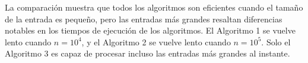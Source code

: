 La comparación muestra que todos los algoritmos
son eficientes cuando el tamaño de la entrada es pequeño,
pero las entradas más grandes resaltan diferencias notables
en los tiempos de ejecución de los algoritmos.
El Algoritmo 1 se vuelve lento
cuando $n=10^4$, y el Algoritmo 2
se vuelve lento cuando $n=10^5$.
Solo el Algoritmo 3 es capaz de procesar
incluso las entradas más grandes al instante.

